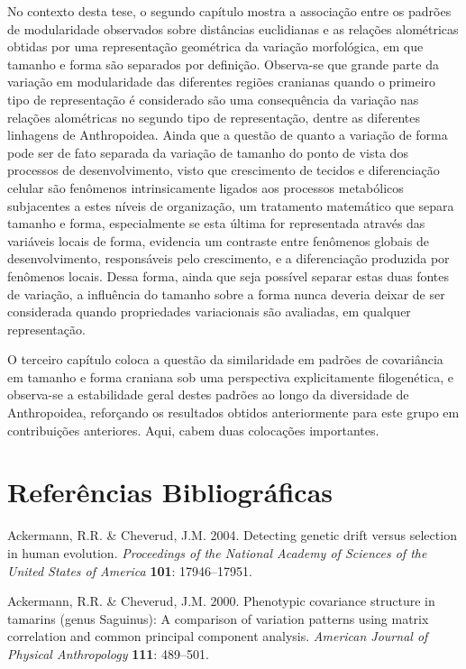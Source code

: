 \documentclass[12pt,twoside]{report}
\begin{document}
No contexto desta tese, o segundo capítulo mostra a associação entre os
padrões de modularidade observados sobre distâncias euclidianas e as
relações alométricas obtidas por uma representação geométrica da
variação morfológica, em que tamanho e forma são separados por
definição. Observa-se que grande parte da variação em modularidade das
diferentes regiões cranianas quando o primeiro tipo de representação é
considerado são uma consequência da variação nas relações alométricas no
segundo tipo de representação, dentre as diferentes linhagens de
Anthropoidea. Ainda que a questão de quanto a variação de forma pode ser
de fato separada da variação de tamanho do ponto de vista dos processos
de desenvolvimento, visto que crescimento de tecidos e diferenciação
celular são fenômenos intrinsicamente ligados aos processos metabólicos
subjacentes a estes níveis de organização, um tratamento matemático que
separa tamanho e forma, especialmente se esta última for representada
através das variáveis locais de forma, evidencia um contraste entre
fenômenos globais de desenvolvimento, responsáveis pelo crescimento, e a
diferenciação produzida por fenômenos locais. Dessa forma, ainda que
seja possível separar estas duas fontes de variação, a influência do
tamanho sobre a forma nunca deveria deixar de ser considerada quando
propriedades variacionais são avaliadas, em qualquer representação.

O terceiro capítulo coloca a questão da similaridade em padrões de
covariância em tamanho e forma craniana sob uma perspectiva
explicitamente filogenética, e observa-se a estabilidade geral destes
padrões ao longo da diversidade de Anthropoidea, reforçando os
resultados obtidos anteriormente para este grupo em contribuições
anteriores. Aqui, cabem duas colocações importantes.

\newpage

\pagestyle{plain}

\chapter*{Referências Bibliográficas}


Ackermann, R.R. \& Cheverud, J.M. 2004. Detecting genetic drift versus
selection in human evolution. \emph{Proceedings of the National Academy
of Sciences of the United States of America} \textbf{101}: 17946--17951.

Ackermann, R.R. \& Cheverud, J.M. 2000. Phenotypic covariance structure
in tamarins (genus Saguinus): A comparison of variation patterns using
matrix correlation and common principal component analysis.
\emph{American Journal of Physical Anthropology} \textbf{111}: 489--501.
\end{document}
